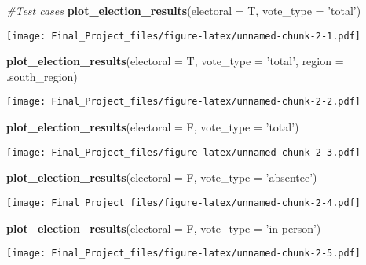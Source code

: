 \documentclass[
]{article}
\newenvironment{Shaded}{\begin{snugshade}}{\end{snugshade}}
\newcommand{\CommentTok}[1]{\textcolor[rgb]{0.56,0.35,0.01}{\textit{#1}}}
\newcommand{\DataTypeTok}[1]{\textcolor[rgb]{0.13,0.29,0.53}{#1}}
\newcommand{\KeywordTok}[1]{\textcolor[rgb]{0.13,0.29,0.53}{\textbf{#1}}}
\newcommand{\NormalTok}[1]{#1}
\newcommand{\StringTok}[1]{\textcolor[rgb]{0.31,0.60,0.02}{#1}}
\begin{document}
\begin{Shaded}
\begin{Highlighting}[]
\CommentTok{#Test cases}
\KeywordTok{plot_election_results}\NormalTok{(}\DataTypeTok{electoral =}\NormalTok{ T, }\DataTypeTok{vote_type =} \StringTok{'total'}\NormalTok{)}
\end{Highlighting}
\end{Shaded}

\texttt{[image: Final\_Project\_files/figure-latex/unnamed-chunk-2-1.pdf]}

\begin{Shaded}
\begin{Highlighting}[]
\KeywordTok{plot_election_results}\NormalTok{(}\DataTypeTok{electoral =}\NormalTok{ T, }\DataTypeTok{vote_type =} \StringTok{'total'}\NormalTok{, }\DataTypeTok{region =}\NormalTok{ .south_region)}
\end{Highlighting}
\end{Shaded}

\texttt{[image: Final\_Project\_files/figure-latex/unnamed-chunk-2-2.pdf]}

\begin{Shaded}
\begin{Highlighting}[]
\KeywordTok{plot_election_results}\NormalTok{(}\DataTypeTok{electoral =}\NormalTok{ F, }\DataTypeTok{vote_type =} \StringTok{'total'}\NormalTok{)}
\end{Highlighting}
\end{Shaded}

\texttt{[image: Final\_Project\_files/figure-latex/unnamed-chunk-2-3.pdf]}

\begin{Shaded}
\begin{Highlighting}[]
\KeywordTok{plot_election_results}\NormalTok{(}\DataTypeTok{electoral =}\NormalTok{ F, }\DataTypeTok{vote_type =} \StringTok{'absentee'}\NormalTok{)}
\end{Highlighting}
\end{Shaded}

\texttt{[image: Final\_Project\_files/figure-latex/unnamed-chunk-2-4.pdf]}

\begin{Shaded}
\begin{Highlighting}[]
\KeywordTok{plot_election_results}\NormalTok{(}\DataTypeTok{electoral =}\NormalTok{ F, }\DataTypeTok{vote_type =} \StringTok{'in-person'}\NormalTok{)}
\end{Highlighting}
\end{Shaded}

\texttt{[image: Final\_Project\_files/figure-latex/unnamed-chunk-2-5.pdf]}
\end{document}
